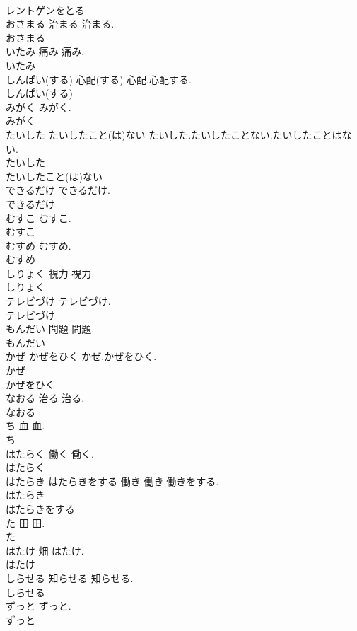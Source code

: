 \documentclass[8pt]{extreport}
\begin{document}
\begin{CJK}{UTF8}{min}
\\	レントゲンをとる
\\	おさまる	治まる	治まる.	
\\	おさまる
\\	いたみ	痛み	痛み.	
\\	いたみ
\\	しんぱい(する)	心配(する)	心配.心配する.	
\\	しんぱい(する)
\\	みがく		みがく.	
\\	みがく
\\	たいした たいしたこと(は)ない		たいした.たいしたことない.たいしたことはない.	
\\	たいした
\\	たいしたこと(は)ない
\\	できるだけ		できるだけ.	
\\	できるだけ
\\	むすこ		むすこ.	
\\	むすこ
\\	むすめ		むすめ.	
\\	むすめ
\\	しりょく	視力	視力.	
\\	しりょく
\\	テレビづけ		テレビづけ.	
\\	テレビづけ
\\	もんだい	問題	問題.	
\\	もんだい
\\	かぜ かぜをひく		かぜ.かぜをひく.	
\\	かぜ
\\	かぜをひく
\\	なおる	治る	治る.	
\\	なおる
\\	ち	血	血.	
\\	ち
\\	はたらく	働く	働く.	
\\	はたらく
\\	はたらき はたらきをする	働き	働き.働きをする.	
\\	はたらき
\\	はたらきをする
\\	た	田	田.	
\\	た
\\	はたけ	畑	はたけ.	
\\	はたけ
\\	しらせる	知らせる	知らせる.	
\\	しらせる
\\	ずっと		ずっと.	
\\	ずっと

\end{CJK}
\end{document}
